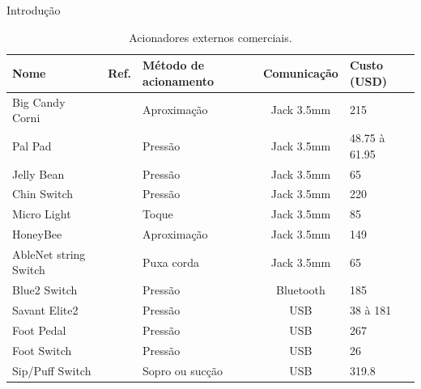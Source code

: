 \begin{chapter}{Introdução}
\begin{table}[!h]
\centering
\caption{Acionadores externos comerciais.}
\label{tab:acionadores}
\def\arraystretch{1.25}
\begin{tabular}{lcp{3cm}cp{3cm}}
	\hline
	\hline
	\textbf{Nome} & Ref. & \textbf{Método de acionamento} & \textbf{Comunicação} & \textbf{Custo (USD)} \\
	\hline
	Big Candy Corni&~\cite{CandyCorn}            & Aproximação  & Jack 3.5mm   & 215              \\
	Pal Pad&~\cite{PalPad}                       & Pressão      & Jack 3.5mm   &  48.75 à 61.95   \\
	Jelly Bean&~\cite{JellyBean}                 & Pressão      & Jack 3.5mm   &   65             \\
	Chin Switch&~\cite{Chin}                     & Pressão      & Jack 3.5mm   & 220              \\
	Micro Light&~\cite{MicroLight}               & Toque        & Jack 3.5mm   & 85               \\ 
	HoneyBee&~\cite{HoneyBee}                    & Aproximação  & Jack 3.5mm   & 149              \\
	AbleNet string Switch&~\cite{StringSwitch}   & Puxa corda & Jack 3.5mm & 65  \\
	Blue2 Switch&~\cite{Blue2}                   & Pressão      & Bluetooth    & 185              \\
	Savant Elite2&~\cite{SavantElite2}           & Pressão      & USB          & 38 à 181         \\
	Foot Pedal&~\cite{FootPedal}                 & Pressão      & USB          & 267              \\
	Foot Switch&~\cite{FootSwitch}               & Pressão      & USB          & 26               \\
	Sip/Puff Switch&~\cite{SipPuff}              & Sopro ou sucção & USB & 319.8  \\  
	
	\hline
	\hline
\end{tabular}
\end{table}


\end{chapter}
